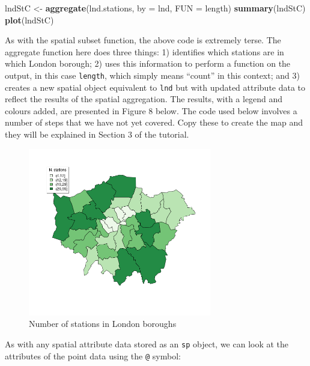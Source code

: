 \documentclass[]{article}
\newenvironment{Shaded}{}{}
\newcommand{\KeywordTok}[1]{\textcolor[rgb]{0.00,0.44,0.13}{\textbf{{#1}}}}
\newcommand{\DataTypeTok}[1]{\textcolor[rgb]{0.56,0.13,0.00}{{#1}}}
\newcommand{\NormalTok}[1]{{#1}}
\let\Oldincludegraphics\includegraphics
\renewcommand{\includegraphics}[1]{\Oldincludegraphics[width=8cm]{#1}}
\begin{document}
\begin{Shaded}
\begin{Highlighting}[]
\NormalTok{lndStC <- }\KeywordTok{aggregate}\NormalTok{(lnd.stations, }\DataTypeTok{by =} \NormalTok{lnd, }\DataTypeTok{FUN =} \NormalTok{length)}
\KeywordTok{summary}\NormalTok{(lndStC)}
\KeywordTok{plot}\NormalTok{(lndStC)}
\end{Highlighting}
\end{Shaded}
As with the spatial subset function, the above code is extremely terse.
The aggregate function here does three things: 1) identifies which
stations are in which London borough; 2) uses this information to
perform a function on the output, in this case \texttt{length}, which
simply means ``count'' in this context; and 3) creates a new spatial
object equivalent to \texttt{lnd} but with updated attribute data to
reflect the results of the spatial aggregation. The results, with a
legend and colours added, are presented in Figure 8 below. The code used
below involves a number of steps that we have not yet covered. Copy
these to create the map and they will be explained in Section 3 of the
tutorial.

\begin{figure}[htbp]
\centering
\includegraphics{figure/nStations.png}
\caption{Number of stations in London boroughs}
\end{figure}

As with any spatial attribute data stored as an \texttt{sp} object, we
can look at the attributes of the point data using the \texttt{@}
symbol:
\end{document}

